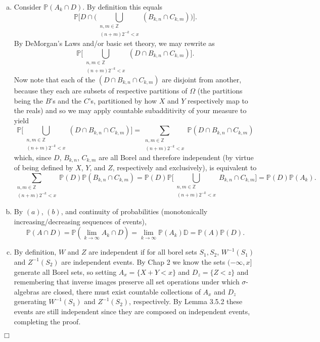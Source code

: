 \documentclass{article}
\begin{document}
\begin{enumerate}[(a)]
\item Consider $\mathbb{P}(A_k \cap D)$. By definition this equals  \[\mathbb{P}\Bigg[ D \cap \Big( \bigcup_{\substack{n,m \in \mathbb{Z} \\ (n+m)2^{-k} < x}} (B_{k,n} \cap C_{k,m}) \Big) \Bigg].\] By DeMorgan's Laws and/or basic set theory, we may rewrite as \[\mathbb{P}\Bigg[ \bigcup_{\substack{n,m \in \mathbb{Z} \\ (n+m)2^{-k} < x}} (D \cap B_{k,n} \cap C_{k,m}) \Bigg].\] Now note that each of the $(D \cap B_{k,n} \cap C_{k,m})$ are disjoint from another, because they each are subsets of respective partitions of $\Omega$ (the partitions being the $B$'s and the $C$'s, partitioned by how $X$ and $Y$ respectively map to the reals) and so we may apply countable subadditivity of your measure to yield  \[\mathbb{P}\Bigg[ \bigcup_{\substack{n,m \in \mathbb{Z} \\ (n+m)2^{-k} < x}} (D \cap B_{k,n} \cap C_{k,m}) \Bigg] = \sum_{\substack{n,m \in \mathbb{Z} \\ (n+m)2^{-k} < x}} \mathbb{P}(D \cap B_{k,n} \cap C_{k,m})\] which, since $D$, $B_{k,n}$, $C_{k,m}$ are all Borel and therefore independent (by virtue of being defined by $X$, $Y$, and $Z$, respectively and exclusively), is equivalent to \[\sum_{\substack{n,m \in \mathbb{Z} \\ (n+m)2^{-k} < x}} \mathbb{P}(D) \mathbb{P}(B_{k,n} \cap C_{k,m}) = \mathbb{P}(D) \mathbb{P} \Big[\bigcup_{\substack{n,m \in \mathbb{Z} \\ (n+m)2^{-k} < x}} B_{k,n} \cap C_{k,m} \Big] = \mathbb{P}(D) \mathbb{P}(A_k).\]

\item By $(a)$, $(b)$, and continuity of probabilities (monotonically increasing/decreasing sequences of events), \[\mathbb{P}(A \cap D) = \mathbb{P}(\lim_{k \to \infty} A_k \cap D) = \lim_{k \to \infty} \mathbb{P}(A_k) \mathbb{D} = \mathbb{P}(A) \mathbb{P}(D). \]

\item By definition, $W$ and $Z$ are independent if for all borel sets $S_1, S_2$, $W^{-1}(S_1)$ and $Z^{-1}(S_2)$ are independent events. By Chap 2 we know the sets $(-\infty, x]$ generate all Borel sets, so setting $A_x = \{X + Y < x\}$ and $D_z = \{Z < z\}$ and remembering that inverse images preserve all set operations under which $\sigma$-algebras are closed, there must exist countable collections of $A_x$ and $D_z$ generating $W^{-1}(S_1)$ and $Z^{-1}(S_2)$, respectively. By Lemma 3.5.2 these events are still independent since they are composed on independent events, completing the proof. 

\end{enumerate}

\hfill $\Box$
\end{document}
